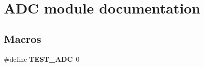 \hypertarget{group___a_d_c__module}{\section{A\-D\-C module documentation}
\label{group___a_d_c__module}
}
\subsection*{Macros}
\begin{DoxyCompactItemize}
\item 
\hypertarget{group___a_d_c__module_gaaa101e52d770ddd28cf31c5cb5fc7691}{\#define {\bfseries T\-E\-S\-T\-\_\-\-A\-D\-C}~0}\label{group___a_d_c__module_gaaa101e52d770ddd28cf31c5cb5fc7691}

\end{DoxyCompactItemize}
